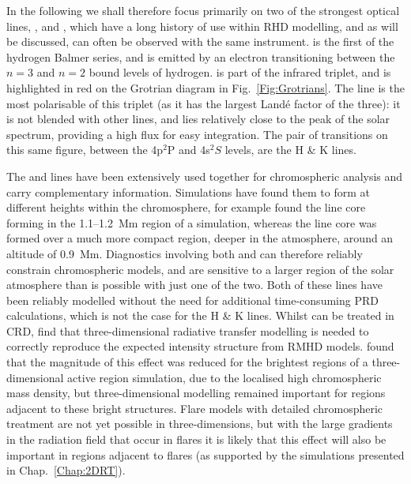 In the following we shall therefore focus primarily on two of the strongest optical lines, \Ha{}, and \CaLine{}, which have a long history of use within RHD modelling, and as will be discussed, can often be observed with the same instrument.
\Ha{} is the first of the hydrogen Balmer series, and is emitted by an electron transitioning between the $n=3$ and $n=2$ bound levels of hydrogen.
\CaLine{} is part of the \Caii{} infrared triplet, and is highlighted in red on the Grotrian diagram in Fig.~\ref{Fig:Grotrians}.
The \CaLine{} line is the most polarisable of this triplet (as it has the largest Landé factor of the three): it is not blended with other lines, and lies relatively close to the peak of the solar spectrum, providing a high flux for easy integration.
The pair of transitions on this same figure, between the 4p$^2$P and 4s$^2S$ levels, are the \Caii{} H \& K lines.

The \Ha{} and \CaLine{} lines have been extensively used together for chromospheric analysis and carry complementary information.
Simulations have found them to form at different heights within the chromosphere, for example \citet{Kuridze2015} found the \Ha{} line core forming in the 1.1--\SI{1.2}{\mega\metre} region of a \Radyn{} simulation, whereas the \CaLine{} line core was formed over a much more compact region, deeper in the atmosphere, around an altitude of \SI{0.9}{\mega\m}.
Diagnostics involving both \Ha{} and \CaLine{} can therefore reliably constrain chromospheric models, and are sensitive to a larger region of the solar atmosphere than is possible with just one of the two.
Both of these lines have been reliably modelled without the need for additional time-consuming PRD calculations, which is not the case for the \Caii{} H \& K lines.
Whilst \Ha{} can be treated in CRD, \citet{Leenaarts2012a} find that three-dimensional radiative transfer modelling is needed to correctly reproduce the expected intensity structure from RMHD models.
\citet{Bjorgen2019} found that the magnitude of this effect was reduced for the brightest regions of a three-dimensional active region simulation, due to the localised high chromospheric mass density, but three-dimensional modelling remained important for regions adjacent to these bright structures.
Flare models with detailed chromospheric treatment are not yet possible in three-dimensions, but with the large gradients in the radiation field that occur in flares it is likely that this effect will also be important in regions adjacent to flares (as supported by the simulations presented in Chap.~\ref{Chap:2DRT}).


